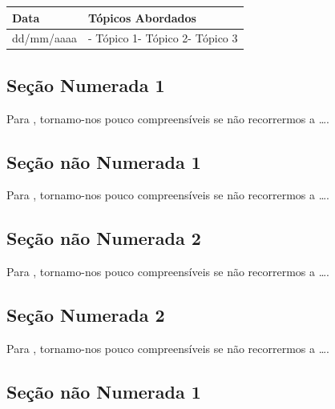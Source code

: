 \documentclass[
]{book}
\begin{document}
\begin{longtable}[]{@{}ll@{}}
\toprule()
Data & Tópicos Abordados \\
\midrule()
\endhead
dd/mm/aaaa & - Tópico 1- Tópico 2- Tópico 3 \\
\bottomrule()
\end{longtable}

\hypertarget{seuxe7uxe3o-numerada-1}{%
\subsection{Seção Numerada 1}\label{seuxe7uxe3o-numerada-1}}

Para \citet{BOCK2001}, tornamo-nos pouco compreensíveis se não recorrermos a \ldots.

\hypertarget{seuxe7uxe3o-nuxe3o-numerada-1}{%
\subsection*{Seção não Numerada 1}\label{seuxe7uxe3o-nuxe3o-numerada-1}}

Para \citet{BOCK2001}, tornamo-nos pouco compreensíveis se não recorrermos a \ldots.

\hypertarget{seuxe7uxe3o-nuxe3o-numerada-2}{%
\subsection*{Seção não Numerada 2}\label{seuxe7uxe3o-nuxe3o-numerada-2}}

Para \citet{BOCK2001}, tornamo-nos pouco compreensíveis se não recorrermos a \ldots.

\hypertarget{seuxe7uxe3o-numerada-2}{%
\subsection{Seção Numerada 2}\label{seuxe7uxe3o-numerada-2}}

Para \citet{BOCK2001}, tornamo-nos pouco compreensíveis se não recorrermos a \ldots.

\hypertarget{seuxe7uxe3o-nuxe3o-numerada-1-1}{%
\subsection*{Seção não Numerada 1}\label{seuxe7uxe3o-nuxe3o-numerada-1-1}}
\end{document}
